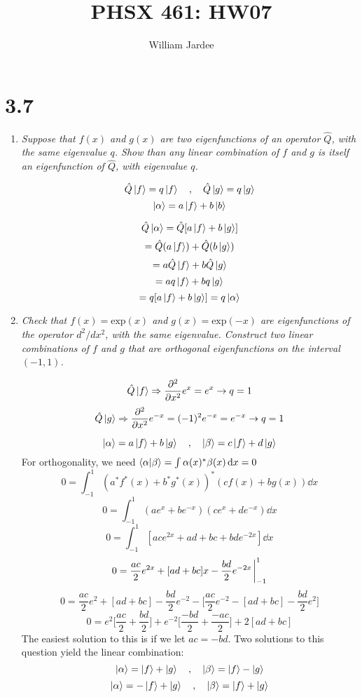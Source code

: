 \documentclass[12pt]{article}
\begin{document}
\title{PHSX 461: HW07}
\author{William Jardee}
\maketitle

\section*{3.7}
\begin{enumerate}[label=\alph*)]
\item \emph{Suppose that $f(x)$ and $g(x)$ are two eigenfunctions of an operator $\hat{Q}$, with the same eigenvalue $q$. Show than any linear combination of $f$ and $g$ is itself an eigenfunction of $\hat{Q}$, with eigenvalue $q$.}\bigskip

\[\hat{Q}\ket{f} = q\ket{f} \quad , \quad \hat{Q}\ket{g} = q \ket{g}\]
\[\ket{\alpha} = a\ket{f} + b\ket{b}\]

\[\hat{Q}\ket{\alpha} = \hat{Q}[a\ket{f} + b\ket{g}]\]
\[=\hat{Q}(a\ket{f}) + \hat{Q}(b\ket{g})\]
\[=a\hat{Q}\ket{f} + b\hat{Q}\ket{g}\]
\[=aq\ket{f} + bq\ket{g}\]
\[=q[a\ket{f} + b\ket{g}] = q\ket{\alpha}\]

\item \emph{Check that $f(x) = \text{exp} (x)$ and $g(x) = \text{exp} (-x)$ are eigenfunctions of the operator $d^2/dx^2$, with the same eigenvalue. Construct two linear combinations of $f$ and $g$ that are orthogonal eigenfunctions on the interval $(-1,1)$.}

\[\hat{Q}\ket{f} \Rightarrow \pdv[2]{x}e^x =e^x \rightarrow q=1\]
\[\hat{Q}\ket{g} \Rightarrow \pdv[2]{x}e^{-x} =(-1)^2e^{-x}=e^{-x} \rightarrow q=1\]

\[\ket{\alpha} = a\ket{f} + b\ket{g} \quad , \quad \ket{\beta} = c\ket{f} + d\ket{g}\]
For orthogonality, we need $\braket{\alpha}{\beta} = \int \alpha(x)^* \beta(x) \dd{x} = 0$
\[0=\int^1_{-1} (a^* f^*(x) + b^* g^*(x))^* (cf(x) + bg(x)) \dd{x}\]
\[0=\int^1_{-1} (ae^x + be^{-x})(ce^x + de^{-x})\dd{x}\]
\[0=\int^1_{-1} [ace^{2x} + ad+bc + bde^{-2x}] \dd{x}\]
\[0= \frac{ac}{2}e^{2x} + [ad+bc]x -\frac{bd}{2}e^{-2x}\eval^1_{-1}\] 
\[0=\frac{ac}{2}e^2 + [ad+bc] -\frac{bd}{2}e^{-2} -\Big[\frac{ac}{2}e^{-2} -[ad+bc] -\frac{bd}{2}e^2\Big]\]
\[0=e^2\Big[\frac{ac}{2}+\frac{bd}{2}\Big] + e^{-2}\Big[\frac{-bd}{2} + \frac{-ac}{2}\Big] + 2[ad+bc]\]
The easiest solution to this is if we let $ac = -bd$. Two solutions to this question yield the linear combination:
\[\ket{\alpha} = \ket{f} + \ket{g} \quad , \quad \ket{\beta} = \ket{f} -\ket{g}\]
\[\ket{\alpha} = -\ket{f} + \ket{g} \quad , \quad \ket{\beta} = \ket{f} +\ket{g}\]

\end{enumerate}
\end{document}

